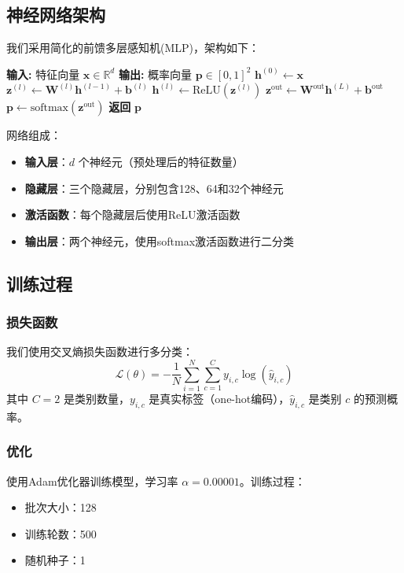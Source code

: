 \documentclass[conference]{IEEEtran}
\begin{document}
\subsection{神经网络架构}

我们采用简化的前馈多层感知机(MLP)，架构如下：

\begin{algorithm}[h]
\caption{神经网络前向传播}
\begin{algorithmic}
\STATE \textbf{输入:} 特征向量 $\mathbf{x} \in \mathbb{R}^d$
\STATE \textbf{输出:} 概率向量 $\mathbf{p} \in [0,1]^2$
\STATE $\mathbf{h}^{(0)} \leftarrow \mathbf{x}$
    \STATE $\mathbf{z}^{(l)} \leftarrow \mathbf{W}^{(l)}\mathbf{h}^{(l-1)} + \mathbf{b}^{(l)}$
    \STATE $\mathbf{h}^{(l)} \leftarrow \text{ReLU}(\mathbf{z}^{(l)})$
\ENDFOR
\STATE $\mathbf{z}^{\text{out}} \leftarrow \mathbf{W}^{\text{out}}\mathbf{h}^{(L)} + \mathbf{b}^{\text{out}}$
\STATE $\mathbf{p} \leftarrow \text{softmax}(\mathbf{z}^{\text{out}})$
\STATE \textbf{返回} $\mathbf{p}$
\end{algorithmic}
\end{algorithm}

网络组成：
\begin{itemize}
    \item \textbf{输入层}：$d$ 个神经元（预处理后的特征数量）
    \item \textbf{隐藏层}：三个隐藏层，分别包含128、64和32个神经元
    \item \textbf{激活函数}：每个隐藏层后使用ReLU激活函数
    \item \textbf{输出层}：两个神经元，使用softmax激活函数进行二分类
\end{itemize}

\subsection{训练过程}

\subsubsection{损失函数}
我们使用交叉熵损失函数进行多分类：
\begin{equation}
\mathcal{L}(\theta) = -\frac{1}{N}\sum_{i=1}^{N}\sum_{c=1}^{C}y_{i,c}\log(\hat{y}_{i,c})
\end{equation}
其中 $C=2$ 是类别数量，$y_{i,c}$ 是真实标签（one-hot编码），$\hat{y}_{i,c}$ 是类别 $c$ 的预测概率。

\subsubsection{优化}
使用Adam优化器训练模型，学习率 $\alpha = 0.00001$。训练过程：
\begin{itemize}
    \item 批次大小：128
    \item 训练轮数：500
    \item 随机种子：1
\end{itemize}
\end{document}
